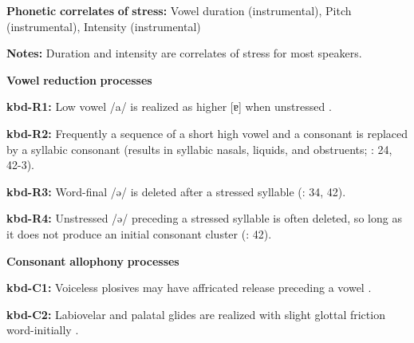 \documentclass[output=paper]{langsci/langscibook}
\begin{document}
\begin{styleBody}
\textbf{Phonetic} \textbf{correlates} \textbf{of} \textbf{stress:} Vowel duration (instrumental), Pitch (instrumental), Intensity (instrumental)
\end{styleBody}

\begin{styleBody}
\textbf{Notes:} Duration and intensity are correlates of stress for most speakers.
\end{styleBody}

\begin{styleBody}
\textbf{Vowel} \textbf{reduction} \textbf{processes}
\end{styleBody}

\begin{styleBody}
\textbf{kbd-R1:} Low vowel /a/ is realized as higher [ɐ] when unstressed \citep[98-9]{Applebaum2013}.
\end{styleBody}

\begin{styleBody}
\textbf{kbd-R2:} Frequently a sequence of a short high vowel and a consonant is replaced by a syllabic consonant (results in syllabic nasals, liquids, and obstruents; \citealt{Kuipers1960}: 24, 42-3).
\end{styleBody}

\begin{styleBody}
\textbf{kbd-R3:} Word-final /ə/ is deleted after a stressed syllable (\citealt{Kuipers1960}: 34, 42).
\end{styleBody}

\begin{styleBody}
\textbf{kbd-R4:} Unstressed /ə/ preceding a stressed syllable is often deleted, so long as it does not produce an initial consonant cluster (\citealt{GordonApplebaum2010}: 42).
\end{styleBody}

\begin{styleBody}
\textbf{Consonant} \textbf{allophony} \textbf{processes}
\end{styleBody}

\begin{styleBody}
\textbf{kbd-C1:} Voiceless plosives may have affricated release preceding a vowel \citep[17]{Kuipers1960}.
\end{styleBody}

\begin{styleBody}
\textbf{kbd-C2:} Labiovelar and palatal glides are realized with slight glottal friction word-initially \citep[22]{Kuipers1960}.
\end{styleBody}
\end{document}
